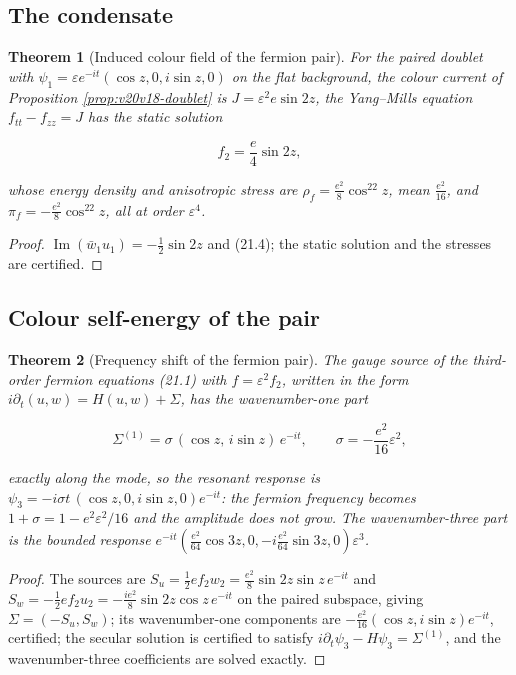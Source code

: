 \documentclass[11pt]{article}
\newtheorem{theorem}{Theorem}[section]
\theoremstyle{remark}
\begin{document}
\subsection{The condensate}

\begin{theorem}[Induced colour field of the fermion pair]
\label{thm:v20v19-condensate}
For the paired doublet with \(\psi_1=\varepsilon e^{-it}(\cos z,0,i\sin z,0)\)
on the flat background, the colour current of Proposition
\ref{prop:v20v18-doublet} is \(J=\varepsilon^2e\sin2z\), the Yang--Mills
equation \(f_{tt}-f_{zz}=J\) has the static solution

\[
 f_2=\frac e4\sin2z,                                                    \tag{22.1}
\]

whose energy density and anisotropic stress are
\(\rho_f=\tfrac{e^2}8\cos^22z\), mean \(\tfrac{e^2}{16}\), and
\(\pi_f=-\tfrac{e^2}8\cos^22z\), all at order \(\varepsilon^4\).
\end{theorem}

\begin{proof}
\(\operatorname{Im}(\bar w_1u_1)=-\tfrac12\sin2z\) and (21.4); the
static solution and the stresses are certified.
\end{proof}

\subsection{Colour self-energy of the pair}

\begin{theorem}[Frequency shift of the fermion pair]
\label{thm:v20v19-shift}
The gauge source of the third-order fermion equations (21.1) with
\(f=\varepsilon^2f_2\), written in the form \(i\partial_t(u,w)=H(u,w)+\Sigma\),
has the wavenumber-one part

\[
 \Sigma^{(1)}=\sigma\,(\cos z,\,i\sin z)\,e^{-it},\qquad \sigma=-\frac{e^2}{16}\varepsilon^2,
                                                                    \tag{22.2}
\]

exactly along the mode, so the resonant response is
\(\psi_3=-i\sigma t\,(\cos z,0,i\sin z,0)e^{-it}\): the fermion
frequency becomes \(1+\sigma=1-e^2\varepsilon^2/16\) and the amplitude
does not grow.  The wavenumber-three part is the bounded response
\(e^{-it}(\tfrac{e^2}{64}\cos3z,0,-i\tfrac{e^2}{64}\sin3z,0)\varepsilon^3\).
\end{theorem}

\begin{proof}
The sources are \(S_u=\tfrac12ef_2w_2=\tfrac{e^2}8\sin2z\sin z\,e^{-it}\)
and \(S_w=-\tfrac12ef_2u_2=-\tfrac{ie^2}8\sin2z\cos z\,e^{-it}\) on the
paired subspace, giving \(\Sigma=(-S_u,S_w)\); its wavenumber-one
components are \(-\tfrac{e^2}{16}(\cos z,i\sin z)e^{-it}\), certified;
the secular solution is certified to satisfy
\(i\partial_t\psi_3-H\psi_3=\Sigma^{(1)}\), and the wavenumber-three
coefficients are solved exactly.
\end{proof}
\end{document}
